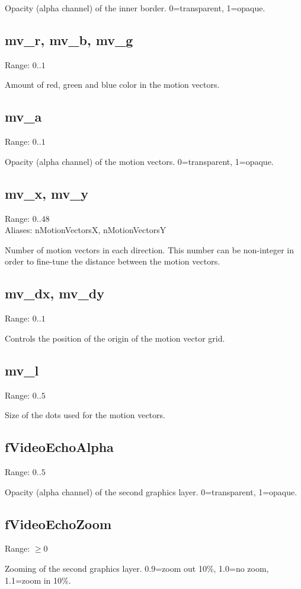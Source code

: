 \documentclass[11pt, a5paper, pagesize]{scrbook}
\begin{document}
Opacity (alpha channel) of the inner border. 0=transparent, 1=opaque.

\subsection{mv\_r, mv\_b, mv\_g}
Range: $0..1$

Amount of red, green and blue color in the motion vectors.

\subsection{mv\_a}
Range: $0..1$

Opacity (alpha channel) of the motion vectors. 0=transparent, 1=opaque.

\subsection{mv\_x, mv\_y}
Range: $0..48$\\
Aliases: nMotionVectorsX, nMotionVectorsY

Number of motion vectors in each direction. This number can be non-integer in order to fine-tune the distance between the motion vectors.

\subsection{mv\_dx, mv\_dy}
Range: $0..1$

Controls the position of the origin of the motion vector grid.

\subsection{mv\_l}
Range: $0..5$

Size of the dots used for the motion vectors.

\subsection{fVideoEchoAlpha}
Range: $0..5$

Opacity (alpha channel) of the second graphics layer. 0=transparent, 1=opaque.

\subsection{fVideoEchoZoom}
Range: $\geq 0$

Zooming of the second graphics layer. 0.9=zoom out 10\%, 1.0=no zoom, 1.1=zoom in 10\%.
\end{document}

